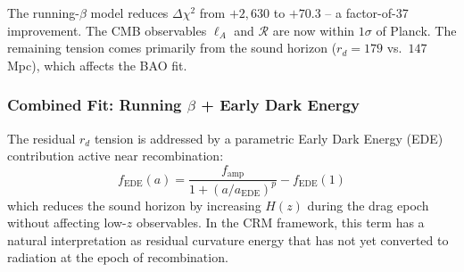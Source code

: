 \documentclass[aps,prd,twocolumn,superscriptaddress,nofootinbib,floatfix]{revtex4-2}
\begin{document}
\begin{table}[t]
\centering
\caption{Running-$\beta$ CRM: optimized parameters and comparison with $\Lambda$CDM.}
\label{tab:running_beta}
\end{table}

The running-$\beta$ model reduces $\Delta\chi^2$ from $+2{,}630$ to $+70.3$ -- a factor-of-37 improvement. The CMB observables $\ell_A$ and $\mathcal{R}$ are now within $1\sigma$ of Planck. The remaining tension comes primarily from the sound horizon ($r_d = 179$ vs.\ $147$\,Mpc), which affects the BAO fit.

\subsubsection{Combined Fit: Running \texorpdfstring{$\beta$}{beta} + Early Dark Energy}

The residual $r_d$ tension is addressed by a parametric Early Dark Energy (EDE) contribution active near recombination:
\begin{equation}
f_{\mathrm{EDE}}(a) = \frac{f_{\mathrm{amp}}}{1 + (a/a_{\mathrm{EDE}})^p} - f_{\mathrm{EDE}}(1)
\end{equation}
which reduces the sound horizon by increasing $H(z)$ during the drag epoch without affecting low-$z$ observables. In the CRM framework, this term has a natural interpretation as residual curvature energy that has not yet converted to radiation at the epoch of recombination.
\end{document}
